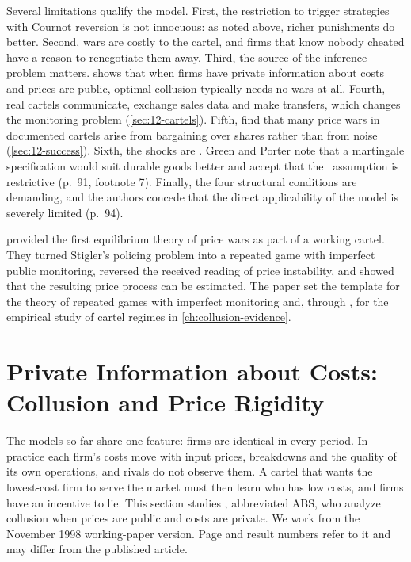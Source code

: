 Several limitations qualify the model. First, the restriction to trigger strategies with Cournot reversion is not
innocuous: as noted above, richer punishments do better. Second, wars are costly to the cartel, and firms that know
nobody cheated have a reason to renegotiate them away. Third, the source of the inference problem matters.
 shows that when firms have private information about costs and prices are public, optimal
collusion typically needs no wars at all. Fourth, real cartels communicate, exchange sales data and make transfers,
which changes the monitoring problem (\cref{sec:12-cartels}). Fifth, \citet{LevensteinSuslow2006} find that many price
wars in documented cartels arise from bargaining over shares rather than from noise (\cref{sec:12-success}). Sixth, the
shocks are \iid. Green and Porter note that a martingale specification would suit durable goods better and accept
that the \iid\ assumption is restrictive (p.~91, footnote 7). Finally, the four structural conditions are demanding,
and the authors concede that the direct applicability of the model is severely limited (p.~94).

\citet{GreenPorter1984} provided the first equilibrium theory of price wars as part of a working cartel. They turned
Stigler's policing problem into a repeated game with imperfect public monitoring, reversed the received reading of
price instability, and showed that the resulting price process can be estimated. The paper set the template for the
theory of repeated games with imperfect monitoring and, through \citet{Porter1983}, for the empirical study of
cartel regimes in \cref{ch:collusion-evidence}.

\section{Private Information about Costs: Collusion and Price Rigidity}\label{sec:12-private-costs}

The models so far share one feature: firms are identical in every period. In practice each firm's costs move with
input prices, breakdowns and the quality of its own operations, and rivals do not observe them. A cartel that wants
the lowest-cost firm to serve the market must then learn who has low costs, and firms have an incentive to lie. This
section studies \citet{AtheyBagwellSanchirico2004}, abbreviated ABS, who analyze collusion when prices are public and
costs are private. We work from the November 1998 working-paper version. Page and result numbers refer to it and may
differ from the published article.

